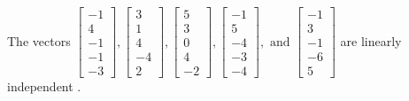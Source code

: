 \begin{exercise}
\begin{exerciseStatement}
  \end{exerciseStatement}
  \begin{exerciseAnswer}
   The vectors \(\left[\begin{array}{r}
-1 \\
4 \\
-1 \\
-1 \\
-3
\end{array}\right] , \left[\begin{array}{r}
3 \\
1 \\
4 \\
-4 \\
2
\end{array}\right] , \left[\begin{array}{r}
5 \\
3 \\
0 \\
4 \\
-2
\end{array}\right] , \left[\begin{array}{r}
-1 \\
5 \\
-4 \\
-3 \\
-4
\end{array}\right] , \text{ and } \left[\begin{array}{r}
-1 \\
3 \\
-1 \\
-6 \\
5
\end{array}\right]\) are 
  	 linearly independent  .
  


  \end{exerciseAnswer}
\end{exercise}
